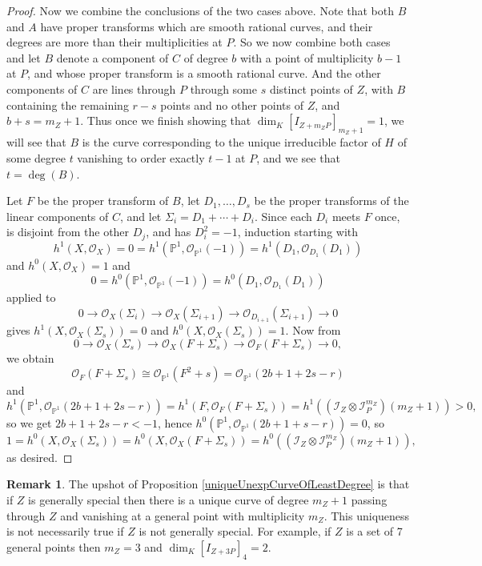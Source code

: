 \documentclass[12pt]{amsart}
\numberwithin{equation}{section}
\theoremstyle{definition}
\newtheorem{remark}[theorem]{Remark}
\begin{document}
\begin{proof}
\medskip

Now we combine the conclusions of the two cases above. Note that both $B$  and $A$ have proper transforms which are smooth rational curves, 
and their degrees are  more than their multiplicities at $P$. So we now combine both cases
and let $B$ denote a component of $C$ of degree $b$ with a point of multiplicity $b-1$ at $P$,
and whose proper transform is a smooth rational curve.
And the other components of $C$ are lines through $P$ through some $s$ distinct points of $Z$,
with $B$ containing the remaining $r-s$ points and no other points of $Z$,  and $b+s = m_Z +1$.
Thus once we finish showing that $\dim_K [I_{Z+m_ZP}]_{m_Z+1}=1$, we will see that
$B$ is the curve corresponding to the unique irreducible factor of $H$ of some degree $t$ vanishing to order
exactly $t-1$ at $P$, and we see that $t=\deg(B)$.

Let $F$ be the proper transform of $B$, let $D_1,\ldots,D_s$ be the proper transforms of the
linear components of $C$, and let $\Sigma_i = D_1 + \cdots + D_i$.
Since each $D_i$ meets $F$ once, is disjoint from the other $D_j$, and has $D_i^2=-1$, 
induction starting with 
\[
h^1(X, \mathcal O_X) = 0 = h^1({ \ensuremath{\mathbb{P}}}^1,\mathcal O_{{ \ensuremath{\mathbb{P}}}^1}(-1))=h^1(D_1,\mathcal O_{D_1}(D_1))
\]
and $h^0(X, \mathcal O_X)=1$ and 
\[
0=h^0({ \ensuremath{\mathbb{P}}}^1,\mathcal O_{{ \ensuremath{\mathbb{P}}}^1}(-1))=h^0(D_1,\mathcal O_{D_1}(D_1))
\]
applied to
$$0\to \mathcal O_X(\Sigma_i)\to 
\mathcal O_X(\Sigma_{i+1})\to \mathcal O_{D_{i+1}}(\Sigma_{i+1})\to 0$$
gives $h^1(X, \mathcal O_X(\Sigma_s))=0$ and $h^0(X, \mathcal O_X(\Sigma_s))=1$.
Now from 
\begin{equation}\label{sesArgument}
0\to \mathcal O_X(\Sigma_s)\to 
\mathcal O_X(F+\Sigma_s)\to \mathcal O_F(F+\Sigma_s)\to 0,
\end{equation}
we obtain
\[
\mathcal O_F(F+\Sigma_s)\cong\mathcal O_{{ \ensuremath{\mathbb{P}}}^1}(F^2+s)=\mathcal O_{{ \ensuremath{\mathbb{P}}}^1}(2b+1+2s-r)
\]
and 
\[
h^1({ \ensuremath{\mathbb{P}}}^1,\mathcal O_{{ \ensuremath{\mathbb{P}}}^1}(2b+1+2s-r))=h^1(F,\mathcal O_F(F+\Sigma_s))=h^1((\mathcal I_Z\otimes \mathcal I_P^{m_Z})(m_Z+1))>0,
\] 
so we get $2b+1+2s-r<-1$, hence 
$h^0({ \ensuremath{\mathbb{P}}}^1,\mathcal O_{{ \ensuremath{\mathbb{P}}}^1}(2b+1+s-r))=0$, so
\[
1=h^0(X, \mathcal O_X(\Sigma_s))=h^0(X, \mathcal O_X(F+\Sigma_s))=h^0((\mathcal I_Z\otimes \mathcal I_P^{m_Z})(m_Z+1)),
\] as desired.
\end{proof}

\begin{remark}
The upshot of Proposition \ref{uniqueUnexpCurveOfLeastDegree} is that if $Z$ is generally special then there is a unique curve of degree $m_Z +1$ passing through $Z$ and vanishing at a general point with multiplicity $m_Z$. This uniqueness is not necessarily true if $Z$ is not generally special. For example, if $Z$ is a set of 7 general points then $m_Z = 3$ and $\dim_K [I_{Z + 3 P}]_{4} = 2$.
\end{remark}
\end{document}
